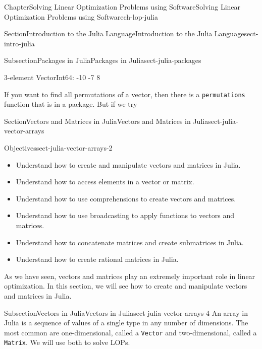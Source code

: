 \documentclass[oneside,10pt,]{book}
\newcommand{\mono}[1]{\texttt{#1}}
\numberwithin{equation}{section}
\begin{document}
\begin{chapterptx}{Chapter}{Solving Linear Optimization Problems using Software}{}{Solving Linear Optimization Problems using Software}{}{}{ch-lop-julia}
\begin{sectionptx}{Section}{Introduction to the Julia Language}{}{Introduction to the Julia Language}{}{}{sect-intro-julia}
\begin{subsectionptx}{Subsection}{Packages in Julia}{}{Packages in Julia}{}{}{sect-julia-packages}
\par
%
\begin{codedisplay}
3-element Vector{Int64}:
  -10
   -7
    8
\end{codedisplay}
%
\par
If you want to find all permutations of a vector, then there is a \mono{permutations} function that is in a package. But if we try%
\end{subsectionptx}
\end{sectionptx}
%
%
\typeout{************************************************}
\typeout{************************************************}
%
\begin{sectionptx}{Section}{Vectors and Matrices in Julia}{}{Vectors and Matrices in Julia}{}{}{sect-julia-vector-arrays}
\begin{objectives}{Objectives}{sect-julia-vector-arrays-2}
%
\begin{itemize}[label=\textbullet]
\item{}Understand how to create and manipulate vectors and matrices in Julia.%
\item{}Understand how to access elements in a vector or matrix.%
\item{}Understand how to use comprehensions to create vectors and matrices.%
\item{}Understand how to use broadcasting to apply functions to vectors and matrices.%
\item{}Understand how to concatenate matrices and create submatrices in Julia.%
\item{}Understand how to create rational matrices in Julia.%
\end{itemize}
\end{objectives}
\begin{introduction}{}%
As we have seen, vectors and matrices play an extremely important role in linear optimization. In this section, we will see how to create and manipulate vectors and matrices in Julia.%
\end{introduction}%
%
%
\typeout{************************************************}
\typeout{************************************************}
%
\begin{subsectionptx}{Subsection}{Vectors in Julia}{}{Vectors in Julia}{}{}{sect-julia-vector-arrays-4}
An array in Julia is a sequence of values of a single type in any number of dimensions. The most common are one-dimensional, called a \mono{Vector} and two-dimensional, called a \mono{Matrix}. We will use both to solve LOPs.%

\end{subsectionptx}
\end{sectionptx}
\end{chapterptx}
\end{document}
